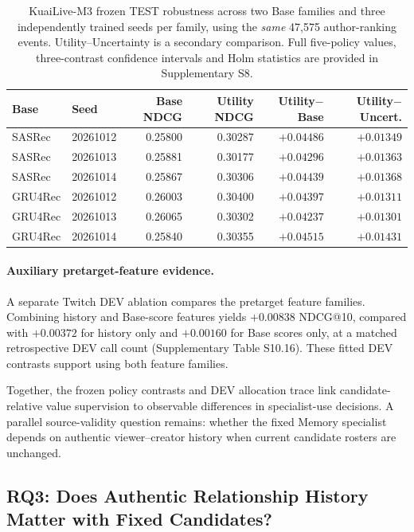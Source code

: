 \begin{table}[!htbp]
\centering
\caption{KuaiLive-M3 frozen TEST robustness across two Base families and three independently trained seeds per family, using the \emph{same} 47,575 author-ranking events. Utility--Uncertainty is a secondary comparison. Full five-policy values, three-contrast confidence intervals and Holm statistics are provided in Supplementary S8.}
\label{tab:results-m3-robustness}
\footnotesize
\setlength{\tabcolsep}{4pt}
\begin{tabular}{@{}llrrrr@{}}
\toprule
Base & Seed & Base NDCG & Utility NDCG & Utility$-$Base & Utility$-$Uncert. \\
\midrule
SASRec & 20261012 & 0.25800 & 0.30287 & $+0.04486$ & $+0.01349$ \\
SASRec & 20261013 & 0.25881 & 0.30177 & $+0.04296$ & $+0.01363$ \\
SASRec & 20261014 & 0.25867 & 0.30306 & $+0.04439$ & $+0.01368$ \\
GRU4Rec & 20261012 & 0.26003 & 0.30400 & $+0.04397$ & $+0.01311$ \\
GRU4Rec & 20261013 & 0.26065 & 0.30302 & $+0.04237$ & $+0.01301$ \\
GRU4Rec & 20261014 & 0.25840 & 0.30355 & $+0.04515$ & $+0.01431$ \\
\bottomrule
\end{tabular}
\end{table}

\paragraph{Auxiliary pretarget-feature evidence.}
A separate Twitch DEV ablation compares the pretarget feature families. Combining history and Base-score features yields $+0.00838$ NDCG@10, compared with $+0.00372$ for history only and $+0.00160$ for Base scores only, at a matched retrospective DEV call count (Supplementary Table S10.16). These fitted DEV contrasts support using both feature families.

Together, the frozen policy contrasts and DEV allocation trace link candidate-relative value supervision to observable differences in specialist-use decisions. A parallel source-validity question remains: whether the fixed Memory specialist depends on authentic viewer--creator history when current candidate rosters are unchanged.

\FloatBarrier
\subsection{RQ3: Does Authentic Relationship History Matter with Fixed Candidates?}
\label{sec:results-robustness}

